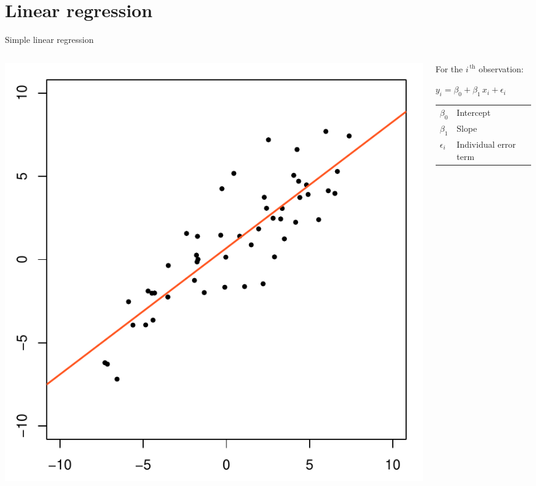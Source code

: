 \section{Linear regression}

\begin{frame}{Simple linear regression}
    \begin{columns}[c]
        \begin{column}{0.5\textwidth}
            \centering
            \includegraphics[width=\textwidth]{figures/lm}
        \end{column}
        \begin{column}{0.5\textwidth}
            {\small%
             For the $i^{\,\text{th}}$ observation:}
            \vspace{-1ex}
            \begin{center}
                $y_{i} = \beta_{0} + \beta_{1}\,x_{i} + \epsilon_{i}$ \\[\bigskipamount]
                \begin{tabular}{ll}
                    \toprule
                    $\beta_{0}$    & Intercept \\
                    $\beta_{1}$    & Slope \\
                    $\epsilon_{i}$ & Individual error term \\
                    \bottomrule
                \end{tabular}
            \end{center}
        \end{column}
    \end{columns}
\end{frame}

